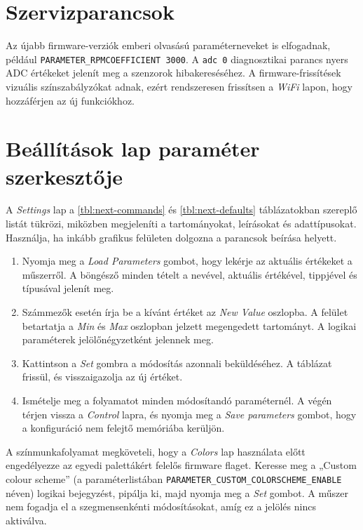 \section{Szervizparancsok}
Az újabb firmware-verziók emberi olvasású paraméterneveket is elfogadnak, például \verb|PARAMETER_RPMCOEFFICIENT 3000|. A \verb|adc 0| diagnosztikai parancs nyers ADC értékeket jelenít meg a szenzorok hibakereséséhez. A firmware-frissítések vizuális színszabályzókat adnak, ezért rendszeresen frissítsen a \emph{WiFi} lapon, hogy hozzáférjen az új funkciókhoz.

\section{Beállítások lap paraméter szerkesztője}
A \emph{Settings} lap a \autoref{tbl:next-commands} és \autoref{tbl:next-defaults} táblázatokban szereplő listát tükrözi, miközben megjeleníti a tartományokat, leírásokat és adattípusokat. Használja, ha inkább grafikus felületen dolgozna a parancsok beírása helyett.

\begin{enumerate}
    \item Nyomja meg a \emph{Load Parameters} gombot, hogy lekérje az aktuális értékeket a műszerről. A böngésző minden tételt a nevével, aktuális értékével, tippjével és típusával jelenít meg.
    \item Számmezők esetén írja be a kívánt értéket az \emph{New Value} oszlopba. A felület betartatja a \emph{Min} és \emph{Max} oszlopban jelzett megengedett tartományt. A logikai paraméterek jelölőnégyzetként jelennek meg.
    \item Kattintson a \emph{Set} gombra a módosítás azonnali beküldéséhez. A táblázat frissül, és visszaigazolja az új értéket.
    \item Ismételje meg a folyamatot minden módosítandó paraméternél. A végén térjen vissza a \emph{Control} lapra, és nyomja meg a \emph{Save parameters} gombot, hogy a konfiguráció nem felejtő memóriába kerüljön.
\end{enumerate}

A színmunkafolyamat megköveteli, hogy a \emph{Colors} lap használata előtt engedélyezze az egyedi palettákért felelős firmware flaget. Keresse meg a „Custom colour scheme” (a paraméterlistában \verb|PARAMETER_CUSTOM_COLORSCHEME_ENABLE| néven) logikai bejegyzést, pipálja ki, majd nyomja meg a \emph{Set} gombot. A műszer nem fogadja el a szegmensenkénti módosításokat, amíg ez a jelölés nincs aktiválva.

